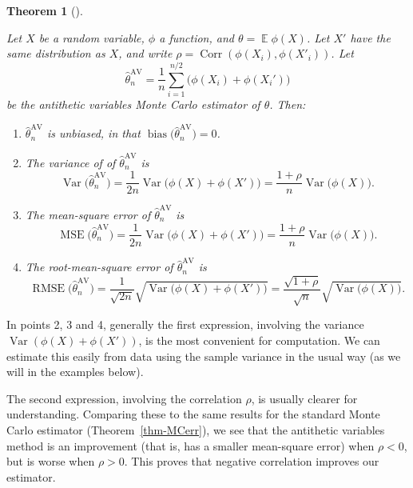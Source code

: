 \documentclass[
  letterpaper,
  DIV=11,
  numbers=noendperiod]{scrreprt}
\newcommand{\Exg}{\operatorname{\mathbb{E}}}
\newcommand{\Var}{\operatorname{Var}}
\theoremstyle{plain}
\newtheorem{theorem}{Theorem}[chapter]
\theoremstyle{definition}
\theoremstyle{definition}
\theoremstyle{remark}
\begin{document}
\begin{theorem}[]\protect\hypertarget{thm-AVerr}{}\label{thm-AVerr}

Let \(X\) be a random variable, \(\phi\) a function, and
\(\theta = \Exg\phi(X)\). Let \(X'\) have the same distribution as
\(X\), and write \(\rho = \operatorname{Corr}(\phi(X_i),\phi(X'_i))\).
Let
\[ \widehat{\theta}_n^{\mathrm{AV}} = \frac{1}{n} \sum_{i=1}^{n/2} \big(\phi(X_i) + \phi(X_i')\big) \]
be the antithetic variables Monte Carlo estimator of \(\theta\). Then:

\begin{enumerate}
\def\labelenumi{\arabic{enumi}.}
\item
  \(\widehat{\theta}_n^{\mathrm{AV}}\) is unbiased, in that
  \(\operatorname{bias}\big(\widehat{\theta}_n^{\mathrm{AV}}\big) = 0\).
\item
  The variance of of \(\widehat{\theta}_n^{\mathrm{AV}}\) is
  \[ \operatorname{Var}\big(\widehat{\theta}_n^{\mathrm{AV}}\big) = \frac{1}{2n} \operatorname{Var}\big(\phi(X) + \phi(X')\big) = \frac{1+\rho}{n}\Var\big(\phi(X)\big). \]
\item
  The mean-square error of \(\widehat{\theta}_n^{\mathrm{AV}}\) is
  \[ \operatorname{MSE}\big(\widehat{\theta}_n^{\mathrm{AV}}\big) = \frac{1}{2n} \operatorname{Var}\big(\phi(X) + \phi(X')\big) = \frac{1+\rho}{n}\Var\big(\phi(X)\big). \]
\item
  The root-mean-square error of \(\widehat{\theta}_n^{\mathrm{AV}}\) is
  \[ \operatorname{RMSE}\big(\widehat{\theta}_n^{\mathrm{AV}}\big) = \frac{1}{\sqrt{2n}} \sqrt{\operatorname{Var}\big(\phi(X) + \phi(X')\big)} = \frac{\sqrt{1+\rho}}{\sqrt{n}}\sqrt{\Var\big(\phi(X)\big)}. \]
\end{enumerate}

\end{theorem}

In points 2, 3 and 4, generally the first expression, involving the
variance \(\operatorname{Var}(\phi(X) + \phi(X'))\), is the most
convenient for computation. We can estimate this easily from data using
the sample variance in the usual way (as we will in the examples below).

The second expression, involving the correlation \(\rho\), is usually
clearer for understanding. Comparing these to the same results for the
standard Monte Carlo estimator (Theorem~\ref{thm-MCerr}), we see that
the antithetic variables method is an improvement (that is, has a
smaller mean-square error) when \(\rho < 0\), but is worse when
\(\rho > 0\). This proves that negative correlation improves our
estimator.
\end{document}
